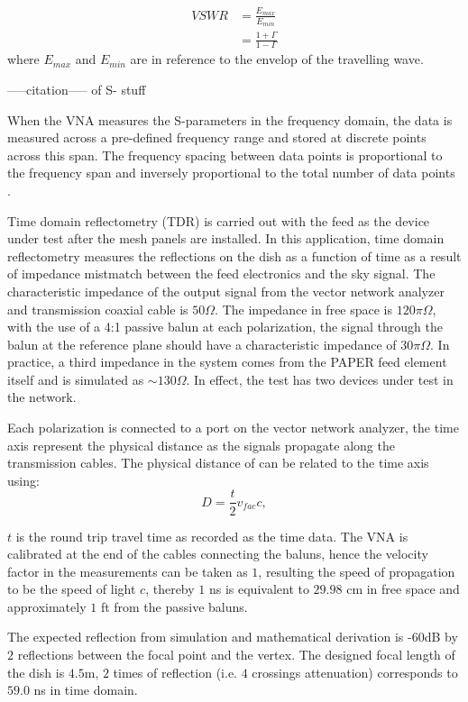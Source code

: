 \documentclass[preprint]{aastex}  %
\begin{document}
\begin{align}
VSWR & = \frac{E_{max}}{E_{min}} \nonumber \\
&	 = \frac{1+\Gamma}{1-\Gamma}
\end{align}
where $E_{max}$ and $E_{min}$ are in reference to the envelop of the travelling 
wave. 

-----citation----- of S- stuff

When the VNA measures the S-parameters in the frequency domain, the data is 
measured across a pre-defined frequency range and stored at discrete points 
across this span. The frequency spacing between data points is proportional to 
the frequency span and inversely proportional to the total number of data points
.

Time domain reflectometry (TDR) is carried out with the feed as the device 
under test after the mesh panels are installed. In this application, time 
domain reflectometry measures the reflections on the dish as a function of time 
as a result of impedance mistmatch between the feed electronics and the sky 
signal. The characteristic impedance of the output signal from the vector network analyzer and transmission coaxial cable is $50\Omega$. The impedance in free space is $120\pi\Omega$, with the use of a 4:1 passive balun at each polarization, the signal through the balun at the reference plane should have a characteristic impedance of $30\pi\Omega$. In practice, a third impedance in the system comes from the PAPER feed element itself and is simulated as $\sim130\Omega$. In effect, the test has two devices under test in the network.

Each polarization is connected to a port on the vector network analyzer, the time axis represent the physical distance as the signals propagate along the transmission cables. The physical distance of can be related to the time axis using:
\begin{equation}
D = \frac{t}{2}v_{fac}c,
\end{equation}

$t$ is the round trip travel time as recorded as the time data.
The VNA is calibrated at the end of the cables connecting the baluns, hence the 
velocity factor in the measurements can be taken as $1$, resulting the speed of 
propagation to be the speed of light $c$, thereby $1$ ns is equivalent to $29.98$ cm in free space and approximately $1$ ft from the passive baluns.

The expected reflection from simulation and mathematical derivation is -$60$dB by $2$ reflections between the focal point and the vertex. The designed focal length of the dish is $4.5$m, $2$ times of reflection (i.e. $4$ crossings attenuation) corresponds to $59.0$ ns in time domain.
\end{document}
